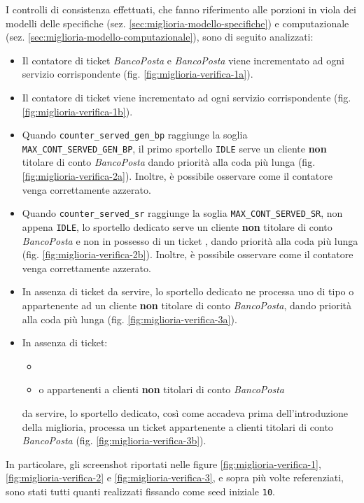 I controlli di consistenza effettuati, che fanno riferimento alle porzioni in {\color{purple} viola} dei modelli delle specifiche (sez. \ref{sec:miglioria-modello-specifiche}) e computazionale (sez. \ref{sec:miglioria-modello-computazionale}), sono di seguito analizzati:
\begin{itemize}
\item Il contatore di ticket \uo{} \textsl{BancoPosta} e \pp{} \textsl{BancoPosta} viene incrementato ad ogni servizio corrispondente (fig. \ref{fig:miglioria-verifica-1a}).
\item Il contatore di ticket \sr{} viene incrementato ad ogni servizio corrispondente (fig. \ref{fig:miglioria-verifica-1b}).
\item Quando \texttt{counter\_served\_gen\_bp} raggiunge la soglia \texttt{MAX\_CONT\_SERVED\_GEN\_BP}, il primo sportello \texttt{IDLE} serve un cliente \textbf{non} titolare di conto \textsl{BancoPosta} dando priorità alla coda più lunga (fig. \ref{fig:miglioria-verifica-2a}). Inoltre, è possibile osservare come il contatore venga correttamente azzerato.
\item Quando \texttt{counter\_served\_sr} raggiunge la soglia \texttt{MAX\_CONT\_SERVED\_SR}, non appena \texttt{IDLE}, lo sportello dedicato serve un cliente \textbf{non} titolare di conto \textsl{BancoPosta} e non in possesso di un ticket \sr{}, dando priorità alla coda più lunga (fig. \ref{fig:miglioria-verifica-2b}). Inoltre, è possibile osservare come il contatore venga correttamente azzerato.
\item In assenza di ticket \sr{} da servire, lo sportello dedicato ne processa uno di tipo \uo{} o \pp{} appartenente ad un cliente \textbf{non} titolare di conto \textsl{BancoPosta}, dando priorità alla coda più lunga (fig. \ref{fig:miglioria-verifica-3a}).
\item In assenza di ticket:
\begin{itemize}
\item \sr{}
\item \uo{} o \pp{} appartenenti a clienti \textbf{non} titolari di conto \textsl{BancoPosta}
\end{itemize}
da servire, lo sportello dedicato, così come accadeva prima dell'introduzione della miglioria, processa un ticket appartenente a clienti titolari di conto \textsl{BancoPosta} (fig. \ref{fig:miglioria-verifica-3b}). 
\end{itemize}

In particolare, gli screenshot riportati nelle figure \ref{fig:miglioria-verifica-1}, \ref{fig:miglioria-verifica-2} e \ref{fig:miglioria-verifica-3}, e sopra più volte referenziati, sono stati tutti quanti realizzati fissando come seed iniziale \texttt{10}.

